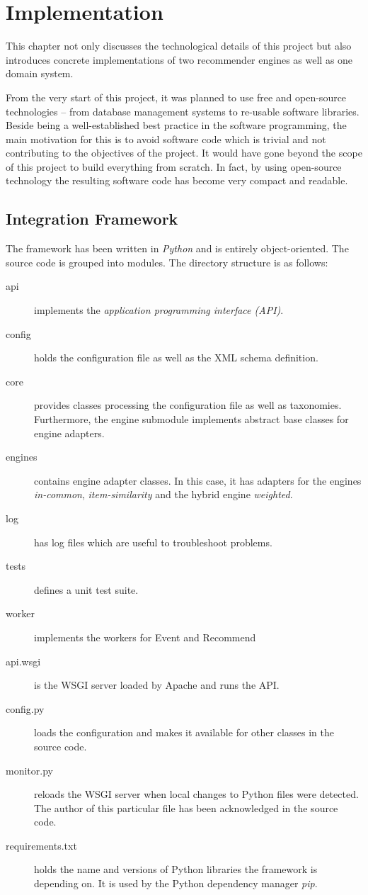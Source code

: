 \chapter{Implementation}

This chapter not only discusses the technological details of this project but also introduces concrete implementations of two recommender engines as well as one domain system.

From the very start of this project, it was planned to use free and open-source technologies -- from database management systems to re-usable software libraries. Beside being a well-established best practice in the software programming, the main motivation for this is to avoid software code which is trivial and not contributing to the objectives of the project. It would have gone beyond the scope of this project to build everything from scratch. In fact, by using open-source technology the resulting software code has become very compact and readable.

\section{Integration Framework}

The framework has been written in \emph{Python} and is entirely object-oriented. The source code is grouped into modules. The directory structure is as follows:

\begin{description}
    \item[api] implements the \emph{application programming interface (API)}.
    \item[config] holds the configuration file as well as the XML schema definition.
    \item[core] provides classes processing the configuration file as well as taxonomies. Furthermore, the engine submodule implements abstract base classes for engine adapters.
    \item[engines] contains engine adapter classes. In this case, it has adapters for the engines \emph{in-common}, \emph{item-similarity} and the hybrid engine \emph{weighted}.
    \item[log] has log files which are useful to troubleshoot problems.
    \item[tests] defines a unit test suite.
    \item[worker] implements the workers for Event and Recommend
    \item[api.wsgi] is the WSGI server loaded by Apache and runs the API.
    \item[config.py] loads the configuration and makes it available for other classes in the source code.
    \item[monitor.py] reloads the WSGI server when local changes to Python files were detected. The author of this particular file has been acknowledged in the source code.
    \item[requirements.txt] holds the name and versions of Python libraries the framework is depending on. It is used by the Python dependency manager \emph{pip}.
\end{description}

